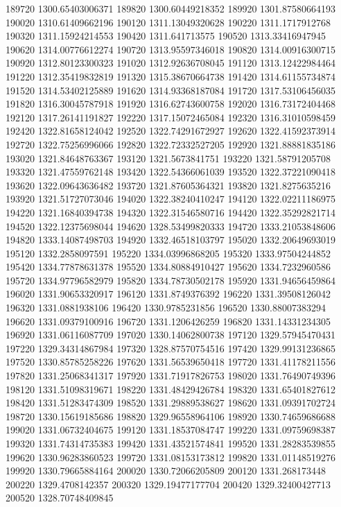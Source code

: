 {189720 1300.65403006371
189820 1300.60449218352
189920 1301.87580664193
190020 1310.61409662196
190120 1311.13049320628
190220 1311.1717912768
190320 1311.15924214553
190420 1311.641713575
190520 1313.33416947945
190620 1314.00776612274
190720 1313.95597346018
190820 1314.00916300715
190920 1312.80123300323
191020 1312.92636708045
191120 1313.12422984464
191220 1312.35419832819
191320 1315.38670664738
191420 1314.61155734874
191520 1314.53402125889
191620 1314.93368187084
191720 1317.53106456035
191820 1316.30045787918
191920 1316.62743600758
192020 1316.73172404468
192120 1317.26141191827
192220 1317.15072465084
192320 1316.31010598459
192420 1322.81658124042
192520 1322.74291672927
192620 1322.41592373914
192720 1322.75256996066
192820 1322.72332527205
192920 1321.88881835186
193020 1321.84648763367
193120 1321.5673841751
193220 1321.58791205708
193320 1321.47559762148
193420 1322.54366061039
193520 1322.37221090418
193620 1322.09643636482
193720 1321.87605364321
193820 1321.8275635216
193920 1321.51727073046
194020 1322.38240410247
194120 1322.02211186975
194220 1321.16840394738
194320 1322.31546580716
194420 1322.35292821714
194520 1322.12375698044
194620 1328.53499820333
194720 1333.21053848606
194820 1333.14087498703
194920 1332.46518103797
195020 1332.20649693019
195120 1332.2858097591
195220 1334.03996868205
195320 1333.97504244852
195420 1334.77878631378
195520 1334.80884910427
195620 1334.7232960586
195720 1334.97796582979
195820 1334.78730502178
195920 1331.94656459864
196020 1331.90653320917
196120 1331.8749376392
196220 1331.39508126042
196320 1331.0881938106
196420 1330.9785231856
196520 1330.88007383294
196620 1331.09379100916
196720 1331.1206426259
196820 1331.14331234305
196920 1331.06116087709
197020 1330.14062800738
197120 1329.57945470431
197220 1329.34314867984
197320 1328.87570754516
197420 1329.99131236865
197520 1330.85785258226
197620 1331.56539650418
197720 1331.41178211556
197820 1331.25068341317
197920 1331.71917826753
198020 1331.76490749396
198120 1331.51098319671
198220 1331.48429426784
198320 1331.65401827612
198420 1331.51283474309
198520 1331.29889538627
198620 1331.09391702724
198720 1330.15619185686
198820 1329.96558964106
198920 1330.74659686688
199020 1331.06732404675
199120 1331.18537084747
199220 1331.09759698387
199320 1331.74314735383
199420 1331.43521574841
199520 1331.28283539855
199620 1330.96283860523
199720 1331.08153173812
199820 1331.01148519276
199920 1330.79665884164
200020 1330.72066205809
200120 1331.268173448
200220 1329.4708142357
200320 1329.19477177704
200420 1329.32400427713
200520 1328.70748409845
}
